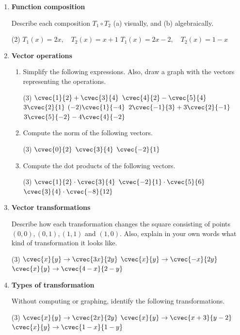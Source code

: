 \begin{enumerate}
\item \textbf{Function composition} 

Describe each composition $T_1 \circ T_2$ (a) visually, and (b) algebraically.
\begin{tasks}[after-item-skip = 70pt, after-skip = 100pt](2)
\task $T_1(x) = 2x, \quad T_2(x) = x+1$
\task $T_1(x) = 2x-2, \quad T_2(x) = 1-x$
\end{tasks}


\item \textbf{Vector operations} 

\begin{enumerate}
\item Simplify the following expressions. Also, draw a graph with the vectors representing the operations.
\begin{tasks}[after-item-skip = 70pt, after-skip = 70pt](3)
\task $ \cvec{1}{2} + \cvec{3}{4}$
\task $ \cvec{4}{2} - \cvec{5}{4}$
\task $ 3\cvec{2}{1}$
\task $ (-2)\cvec{1}{-4}$
\task $2\cvec{-1}{3} + 3\cvec{2}{-1}$
\task $3\cvec{5}{-2}-4\cvec{4}{-2}$
\end{tasks}

\item Compute the norm of the following vectors.
\begin{tasks}[after-skip = 70pt](3)
\task $ \cvec{0}{2}$
\task $\cvec{3}{4}$
\task $\cvec{-2}{1}$
\end{tasks}

\item Compute the dot products of the following vectors.
\begin{tasks}[after-skip = 70pt](3)
\task $ \cvec{1}{2} \cdot \cvec{3}{4}$
\task $ \cvec{-2}{1} \cdot \cvec{5}{6}$
\task $ \cvec{3}{4} \cdot \cvec{-8}{12}$
\end{tasks}
\end{enumerate}

\newpage

\item \textbf{Vector transformations} 

Describe how each transformation changes the square consisting of points $(0,0), (0,1), (1,1)$ and $(1,0)$. Also, explain in your own words what kind of transformation it looks like.
\begin{tasks}[after-skip = 130pt](3)
\task $\cvec{x}{y} \to \cvec{3x}{2y}$
\task $\cvec{x}{y} \to \cvec{-x}{2y}$
\task $\cvec{x}{y} \to \cvec{4-x}{2-y}$
\end{tasks}

\item \textbf{Types of transformation}

Without computing or graphing, identify the following transformations.
\begin{tasks}[after-skip = 70pt](3)
\task $\cvec{x}{y} \to \cvec{2x}{2y}$
\task $\cvec{x}{y} \to \cvec{x+3}{y-2}$
\task $\cvec{x}{y} \to \cvec{1-x}{1-y}$
\end{tasks}
\end{enumerate}